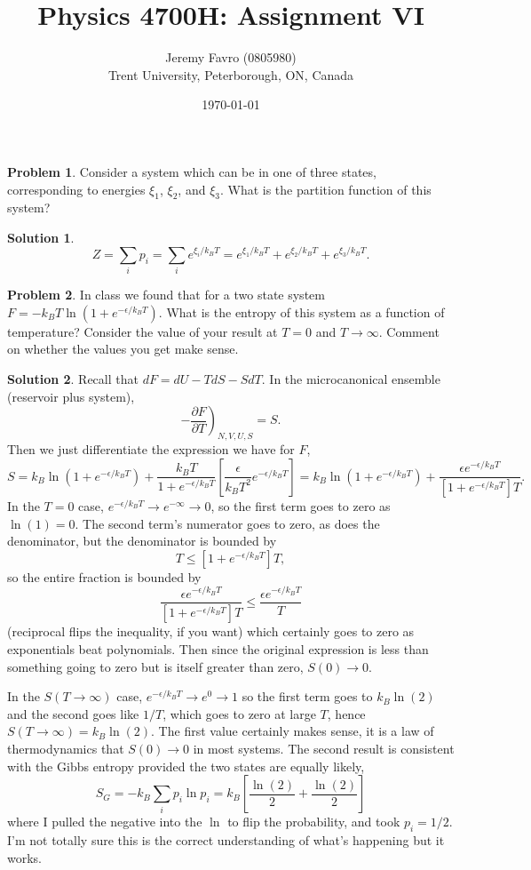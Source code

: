 \documentclass[10pt]{article}
\title{Physics 4700H: Assignment VI}
\author{Jeremy Favro (0805980) \\ Trent University, Peterborough, ON, Canada}
\date{\today}
\theoremstyle{definition}
\newtheorem{problem}{Problem}
\newtheorem{soln}{Solution}
\begin{document}
\maketitle

\begin{problem} Consider a system which can be in one of three states, corresponding to energies $\xi_1$, $\xi_2$,
and $\xi_3$. What is the partition function of this system?
\end{problem}
\begin{soln}
  $$Z=\sum_ip_i=\sum_ie^{\xi_i/k_BT}=e^{\xi_1/k_BT}+e^{\xi_2/k_BT}+e^{\xi_3/k_BT}.$$
\end{soln}

\begin{problem}
In class we found that for a two state system $F = -k_BT\ln(1+e^{-\epsilon/k_BT})$. What is the
entropy of this system as a function of temperature? Consider the value of your result at
$T = 0$ and $T \to \infty $. Comment on whether the values you get make sense.
\end{problem}
\begin{soln}
  Recall that $dF=dU-TdS-SdT$. In the microcanonical ensemble (reservoir plus system),
  $$\left.-\frac{\partial F}{\partial T}\right)_{N,V,U,S}=S.$$
  Then we just differentiate the expression we have for $F$,
  $$S=
    k_B\ln(1+e^{-\epsilon/k_BT})+\frac{k_BT}{1+e^{-\epsilon/k_BT}}\left[\frac{\epsilon}{k_BT^2}e^{-\epsilon/k_BT}\right]
    =k_B\ln(1+e^{-\epsilon/k_BT})+\frac{\epsilon e^{-\epsilon/k_BT}}{\left[1+e^{-\epsilon/k_BT}\right]T}.
  $$
  In the $T=0$ case, $e^{-\epsilon/k_BT}\to e^{-\infty}\to 0$, so the first term goes to zero as $\ln(1)=0$. The second term's
  numerator goes to zero, as does the denominator, but the denominator is bounded by
  $$T\leq \left[1+e^{-\epsilon/k_BT}\right]T,$$
  so the entire fraction is bounded by
  $$\frac{\epsilon e^{-\epsilon/k_BT}}{\left[1+e^{-\epsilon/k_BT}\right]T}\leq \frac{\epsilon e^{-\epsilon/k_BT}}{T}$$
  (reciprocal flips the inequality, if you want)
  which certainly goes to zero as exponentials beat polynomials. Then since the original expression is less than something going to zero but is itself
  greater than zero, $S(0)\to 0$.


  In the $S(T\to\infty)$ case, $e^{-\epsilon/k_BT}\to e^{0}\to 1$ so the first term goes to $k_B\ln(2)$ and the second goes like $1/T$, which goes to zero at large $T$,
  hence $S(T\to\infty)=k_B\ln(2)$. The first value certainly makes sense, it is a law of thermodynamics that $S(0)\to 0$ in most systems.
  The second result is consistent with the Gibbs entropy provided the two states are equally likely,
  $$S_G=-k_B\sum_ip_i\ln p_i=k_B\left[\frac{\ln(2)}{2}+\frac{\ln(2)}{2}\right]$$
  where I pulled the negative into the $\ln$ to flip the probability, and took $p_i=1/2$. I'm not totally sure this is the correct understanding of
  what's happening but it works.
\end{soln}
\newpage
\end{document}
